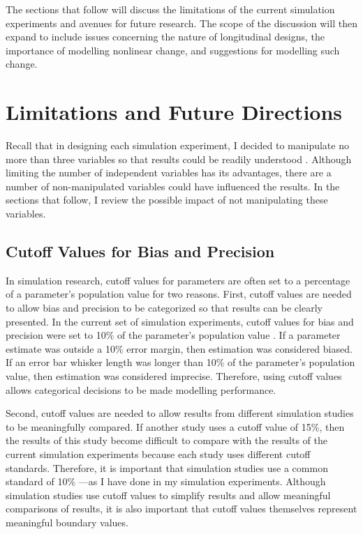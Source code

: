 \documentclass[
12pt, %
twoside,
english]{guelphthesis}
\begin{document}
The sections that follow will discuss the limitations of the current simulation experiments and avenues for future research. The scope of the discussion will then expand to include issues concerning the nature of longitudinal designs, the importance of modelling nonlinear change, and suggestions for modelling such change.

\hypertarget{limitations-and-future-directions}{%
\section{Limitations and Future Directions}\label{limitations-and-future-directions}}

Recall that in designing each simulation experiment, I decided to manipulate no more than three variables so that results could be readily understood \autocite{halford2005}. Although limiting the number of independent variables has its advantages, there are a number of non-manipulated variables could have influenced the results. In the sections that follow, I review the possible impact of not manipulating these variables.

\hypertarget{cutoff-values-for-bias-and-precision}{%
\subsection{Cutoff Values for Bias and Precision}\label{cutoff-values-for-bias-and-precision}}

In simulation research, cutoff values for parameters are often set to a percentage of a parameter's population value \autocite[e.g.,][]{muthen1997} for two reasons. First, cutoff values are needed to allow bias and precision to be categorized so that results can be clearly presented. In the current set of simulation experiments, cutoff values for bias and precision were set to 10\% of the parameter's population value \autocite{muthen1997}. If a parameter estimate was outside a 10\% error margin, then estimation was considered biased. If an error bar whisker length was longer than 10\% of the parameter's population value, then estimation was considered imprecise. Therefore, using cutoff values allows categorical decisions to be made modelling performance.

Second, cutoff values are needed to allow results from different simulation studies to be meaningfully compared. If another study uses a cutoff value of 15\%, then the results of this study become difficult to compare with the results of the current simulation experiments because each study uses different cutoff standards. Therefore, it is
important that simulation studies use a common standard of 10\% \autocite{muthen1997}---as I have done in my simulation
experiments. Although simulation studies use cutoff values to simplify results and allow meaningful comparisons of results, it is also important that cutoff values themselves represent meaningful boundary values.
\end{document}
